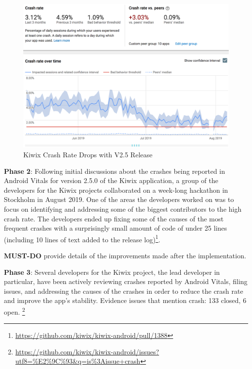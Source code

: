 \begin{figure}[htbp!]
    \centering
    \includegraphics[width=\textwidth]{images/android-vitals-screenshots/kiwix-crash-rate-drops-with-v2_5.png}
    \caption{Kiwix Crash Rate Drops with V2.5 Release}
    \label{fig:kiwix_crash_rate_drops_v2_5}
\end{figure}

\textbf{Phase 2}: Following initial discussions about the crashes being reported in Android Vitals for version 2.5.0 of the Kiwix application, a group of the developers for the Kiwix projects collaborated on a week-long hackathon in Stockholm in August 2019. One of the areas the developers worked on was to focus on identifying and addressing some of the biggest contributors to the high crash rate. 
%
The developers ended up fixing some of the causes of the most frequent crashes with a surprisingly small amount of code of under 25 lines (including 10 lines of text added to the release log)\footnote{\url{https://github.com/kiwix/kiwix-android/pull/1388}}.

\textbf{MUST-DO} provide details of the improvements made after the implementation.


\textbf{Phase 3}: Several developers for the Kiwix project, the lead developer in particular, have been actively reviewing crashes reported by Android Vitals, filing issues, and addressing the causes of the crashes in order to reduce the crash rate and improve the app's stability. Evidence issues that mention crash: 133 closed, 6 open. \footnote{\url{https://github.com/kiwix/kiwix-android/issues?utf8=\%E2\%9C\%93&q=is\%3Aissue+crash}}

